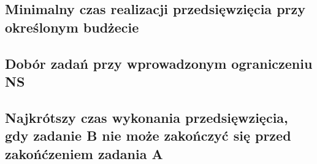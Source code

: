 \documentclass[
    12pt, %
]{../fphw}
\begin{document}
\subsection{Minimalny czas realizacji przedsięwzięcia przy określonym budżecie}
\subsection{Dobór zadań przy wprowadzonym ograniczeniu NS}
\subsection{Najkrótszy czas wykonania przedsięwzięcia, gdy zadanie B nie może zakończyć się przed zakońćzeniem zadania A}
\newpage
\lstlistoflistings
\listoffigures
\listoftables
\end{document}
